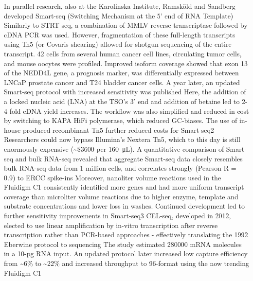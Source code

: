 In parallel research, also at the Karolinska Institute, Ramsk\"{o}ld and Sandberg developed Smart-seq (Switching Mechanism at the 5' end of RNA Template) Similarly to STRT-seq, a combination of MMLV reverse-transcriptase followed by cDNA PCR was used. However, fragmentation of these full-length transcripts using Tn5 (or Covaris shearing) allowed for shotgun sequencing of the entire transcript. 42 cells from several human cancer cell lines, circulating tumor cells, and mouse oocytes were profiled. Improved isoform coverage showed that exon 13 of the NEDD4L gene, a prognosis marker, was differentially expressed between LNCaP prostate cancer and T24 bladder cancer cells. A year later, an updated Smart-seq protocol with increased sensitivity was published Here, the addition of a locked nucleic acid (LNA) at the TSO's 3' end and addition of betaine led to 2-4 fold cDNA yield increases. The workflow was also simplified and reduced in cost by switching to KAPA HiFi polymerase, which reduced GC-biases. The use of in-house produced recombinant Tn5 further reduced costs for Smart-seq2 Researchers could now bypass Illumina's Nextera Tn5, which to this day is still enormously expensive (\textasciitilde\$\num{3600} per \SI{160}{\micro\liter}). A quantitative comparison of Smart-seq and bulk RNA-seq revealed that aggregate Smart-seq data closely resembles bulk RNA-seq data from 1 million cells, and correlates strongly (Pearson R = 0.9) to ERCC spike-ins Moreover, nanoliter volume reactions used in the Fluidigm C1 consistently identified more genes and had more uniform transcript coverage than microliter volume reactions due to higher enzyme, template and substrate concentrations and lower loss in washes. Continued development led to further sensitivity improvements in Smart-seq3 CEL-seq, developed in 2012, elected to use linear amplification by in-vitro transcription after reverse transcription rather than PCR-based approaches - effectively translating the 1992 Eberwine protocol to sequencing The study estimated \num{280000} mRNA molecules in a 10-pg RNA input. An updated protocol later increased low capture efficiency from \textasciitilde{6}\% to \textasciitilde{22}\% and increased throughput to 96-format using the now trending Fluidigm C1

